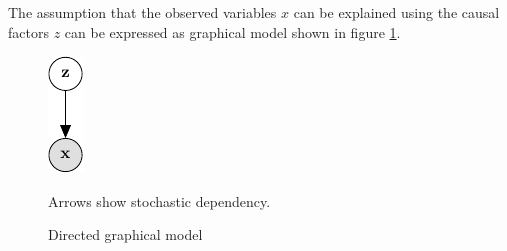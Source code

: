 



The assumption that the observed variables $x$ can be explained using the causal factors $z$ can be expressed as graphical model shown in figure \ref{fig:dgm}.

\begin{figure}[htb]
\centering
\includegraphics{media/directed_graphical_model}
  \caption{Directed graphical model}
  \label{fig:dgm}
  \medskip
  \small
  Arrows show stochastic dependency.
\end{figure}


\newpage













